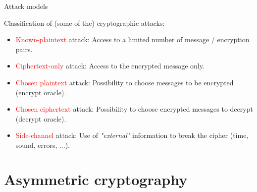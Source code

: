 \documentclass[handout, xcolor=dvipsnames,aspectratio=169]{beamer}
\begin{document}
\begin{frame}{Attack models}

  \medskip

  Classification of (some of the) cryptographic attacks:

  \medskip

  \small

  \begin{itemize}
    \item \textcolor{red}{Known-plaintext} attack: Access to a limited number of message / encryption pairs.
          \medskip
    \item \textcolor{red}{Ciphertext-only} attack: Access to the encrypted message only.
          \medskip
    \item \textcolor{red}{Chosen plaintext} attack: Possibility to choose messages to be encrypted (encrypt oracle).
          \medskip
    \item \textcolor{red}{Chosen ciphertext} attack: Possibility to choose encrypted messages to decrypt (decrypt oracle).
          \medskip
    \item \textcolor{red}{Side-channel} attack: Use of \textit{"external"} information to break the cipher (time, sound, errors, ...).
  \end{itemize}

\end{frame}


\part{Asymmetric cryptography}

\begin{frame}
  \partpage
  \centering
\end{frame}
\end{document}
